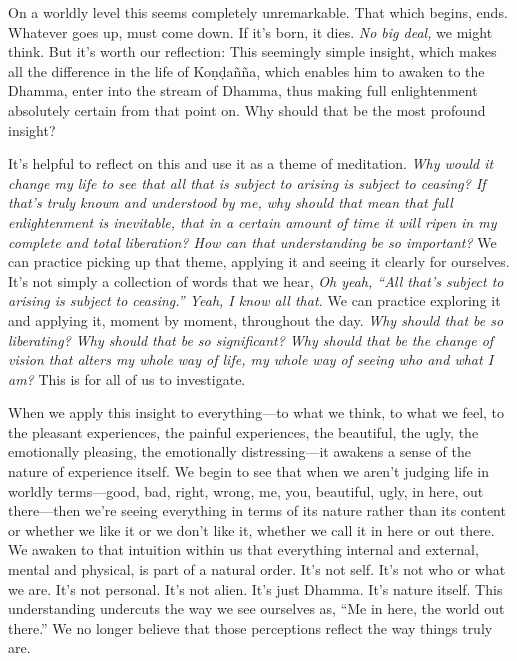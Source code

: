 On a worldly level this seems completely unremarkable. That which 
begins, ends. Whatever goes up, must come down. If it's born, it dies. 
\emph{No big deal,} we might think. But it's worth our reflection: This 
seemingly simple insight, which makes all the difference in the life of 
Koṇḍañña, which enables him to awaken to the Dhamma, enter into 
the stream of Dhamma, thus making full enlightenment absolutely certain 
from that point on. Why should that be the most profound insight?

It's helpful to reflect on this and use it as a theme of meditation. 
\emph{Why would it change my life to see that all that is subject to 
arising is subject to ceasing? If that's truly known and understood by 
me, why should that mean that full enlightenment is inevitable, that in 
a certain amount of time it will ripen in my complete and total 
liberation? How can that understanding be so important?} We can 
practice picking up that theme, applying it and seeing it clearly for 
ourselves. It's not simply a collection of words that we hear, \emph{Oh 
yeah, ``All that's subject to arising is subject to ceasing.'' Yeah, I 
know all that.} We can practice exploring it and applying it, moment by 
moment, throughout the day. \emph{Why should that be so liberating? Why 
should that be so significant? Why should that be the change of vision 
that alters my whole way of life, my whole way of seeing who and what I 
am?} This is for all of us to investigate.

When we apply this insight to everything---to what we think, to what we 
feel, to the pleasant experiences, the painful experiences, the 
beautiful, the ugly, the emotionally pleasing, the emotionally 
distressing---it awakens a sense of the nature of experience itself. We 
begin to see that when we aren't judging life in worldly terms---good, 
bad, right, wrong, me, you, beautiful, ugly, in here, out there---then 
we're seeing everything in terms of its nature rather than its content 
or whether we like it or we don't like it, whether we call it in here 
or out there. We awaken to that intuition within us that everything 
internal and external, mental and physical, is part of a natural order. 
It's not self. It's not who or what we are. It's not personal. It's not 
alien. It's just Dhamma. It's nature itself. This understanding 
undercuts the way we see ourselves as, ``Me in here, the world out 
there.'' We no longer believe that those perceptions reflect the way 
things truly are.

